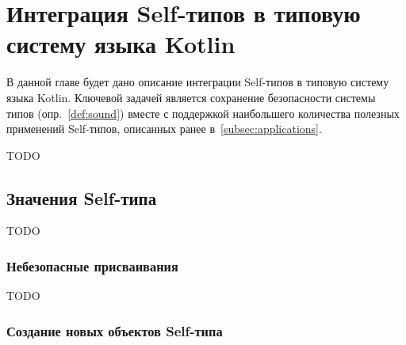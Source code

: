 \section{Интеграция Self-типов в типовую систему языка Kotlin} \label{sec:integration}

В данной главе будет дано описание интеграции Self-типов в типовую систему языка Kotlin.
Ключевой задачей является сохранение безопасности системы типов (опр.~\ref{def:sound}) вместе с поддержкой наибольшего количества полезных применений Self-типов, описанных ранее в~\ref{subsec:applications}.


TODO %

%
%
%



























\subsection{Значения Self-типа}

TODO %

\subsubsection{Небезопасные присваивания}

TODO %

\subsubsection{Создание новых объектов Self-типа}

